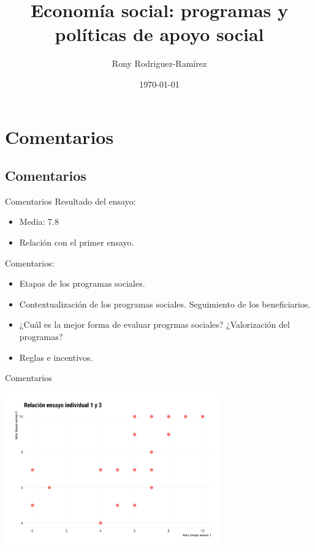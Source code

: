 \documentclass[11pt, aspectratio=169, compress]{beamer}
\title{Economía social: programas y políticas de apoyo social}
\author{Rony Rodriguez-Ramírez}
\institute{Economía Social y Humana | Grupo B018 \\Universidad Centroamericana}
\date{\today}
\begin{document}
	
\begin{frame}[plain]
	\maketitle  
\end{frame}

\section{Comentarios}
\subsection{Comentarios}
\begin{frame}[t]{Comentarios}
Resultado del ensayo:  
\begin{itemize}
\item Media: 7.8 
\item Relación con el primer ensayo. 
\end{itemize}
Comentarios: 
\begin{itemize}
\item Etapas de los programas sociales. 
\item Contextualización de los programas sociales. Seguimiento de los beneficiarios. 
\item ¿Cuál es la mejor forma de evaluar progrmas sociales? ¿Valorización del programas? 
\item Reglas e incentivos. 
\end{itemize}
\end{frame}
\begin{frame}{Comentarios}
\begin{center}
\includegraphics[width=0.7\textwidth]{fig1} 
\end{center}
\end{frame}
\end{document}
